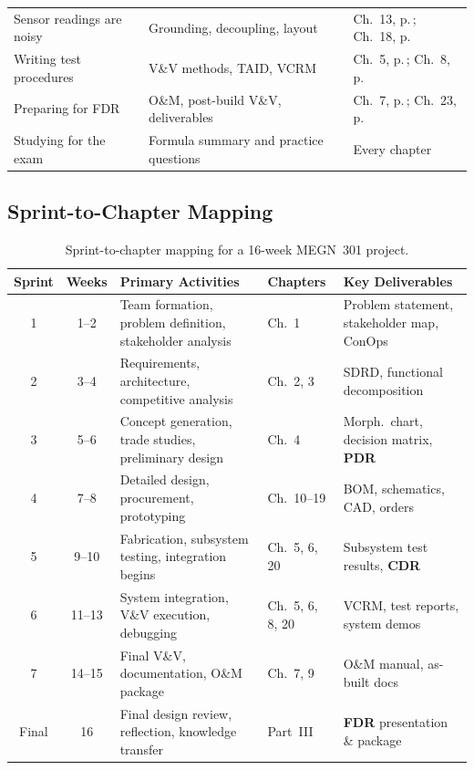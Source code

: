 \begin{center}
\begin{tabularx}{\textwidth}{l X l}
Sensor readings are noisy & Grounding, decoupling, layout & Ch.~13, p.\,\pageref{ch:electronics}; Ch.~18, p.\,\pageref{ch:pcb} \\
Writing test procedures & V\&V methods, TAID, VCRM & Ch.~5, p.\,\pageref{ch:vv}; Ch.~8, p.\,\pageref{ch:postbuild} \\
Preparing for FDR & O\&M, post-build V\&V, deliverables & Ch.~7, p.\,\pageref{ch:oandm}; Ch.~23, p.\,\pageref{ch:fdr} \\
Studying for the exam & Formula summary and practice questions & Every chapter \\
\bottomrule
\end{tabularx}
\end{center}

\subsection*{Sprint-to-Chapter Mapping}

\begin{table}[htbp]
\centering\small
\begin{tabularx}{\textwidth}{c c X l X}
\toprule
\textbf{Sprint} & \textbf{Weeks} & \textbf{Primary Activities} & \textbf{Chapters} & \textbf{Key Deliverables} \\
\midrule
1 & 1--2 & Team formation, problem definition, stakeholder analysis & Ch.~1 & Problem statement, stakeholder map, ConOps \\
2 & 3--4 & Requirements, architecture, competitive analysis & Ch.~2, 3 & SDRD, functional decomposition \\
3 & 5--6 & Concept generation, trade studies, preliminary design & Ch.~4 & Morph.\ chart, decision matrix, \textbf{PDR} \\
4 & 7--8 & Detailed design, procurement, prototyping & Ch.~10--19 & BOM, schematics, CAD, orders \\
5 & 9--10 & Fabrication, subsystem testing, integration begins & Ch.~5, 6, 20 & Subsystem test results, \textbf{CDR} \\
6 & 11--13 & System integration, V\&V execution, debugging & Ch.~5, 6, 8, 20 & VCRM, test reports, system demos \\
7 & 14--15 & Final V\&V, documentation, O\&M package & Ch.~7, 9 & O\&M manual, as-built docs \\
Final & 16 & Final design review, reflection, knowledge transfer & Part~III & \textbf{FDR} presentation \& package \\
\bottomrule
\end{tabularx}
\caption{Sprint-to-chapter mapping for a 16-week MEGN~301 project.}
\end{table}


